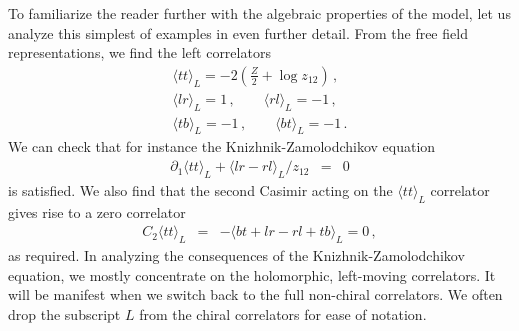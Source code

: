 \documentclass[12pt]{article}
\numberwithin{equation}{section}
\numberwithin{equation}{section}
\numberwithin{table}{section}\setlength{\multlinegap}{25pt}
\begin{document}
To familiarize the reader further with the algebraic properties of the model,
let us analyze this simplest of examples in even further detail.
From the free field representations, we find the left correlators
\begin{eqnarray}
\langle tt \rangle_L = -2 (\frac{Z}{2}+ \log z_{12})  \, , %
\nonumber \\
\langle lr \rangle_L = 1
\, , \qquad
\langle rl \rangle_L = -1 \, , 
\nonumber \\
\langle tb \rangle_L = -1
\, , \qquad
\langle bt \rangle_L = -1 \, .
\end{eqnarray}
We can check that for instance the Knizhnik-Zamolodchikov equation
\begin{eqnarray}
\partial_1 \langle tt \rangle_L + \langle lr-rl \rangle_L/z_{12} &=& 0
\end{eqnarray}
is satisfied. We also find that the second Casimir acting on the $\langle tt \rangle_L$ correlator
gives rise to a zero correlator
\begin{eqnarray}
C_2 \langle tt \rangle_L &=& - \langle bt + lr -rl + tb \rangle_L =0 \, ,
\end{eqnarray}
as required.  In analyzing the consequences of the
Knizhnik-Zamolodchikov equation, we mostly concentrate on the
holomorphic, left-moving correlators. It will be manifest when we
switch back to the full non-chiral correlators. We often drop the
subscript $L$ from the chiral correlators for ease of notation.
\end{document}
